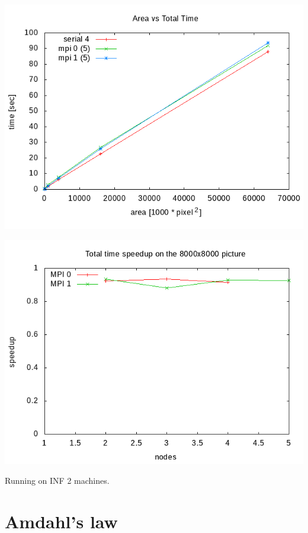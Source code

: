 \documentclass[12pt]{article}
\begin{document}
\begin{center}
    \begin{minipage}[b]{0.45\linewidth}
        \includegraphics[width=\textwidth]{../../plots/areatime_total_linear_mpi.png}
    \end{minipage}
    \begin{minipage}[b]{0.45\linewidth}
        \includegraphics[width=\textwidth]{../../plots/mpi_speedup_total_8000_no_ideal.png}
    \end{minipage}
\end{center}

\small Running on INF 2 machines.

\section{Amdahl's law}
\end{document}
